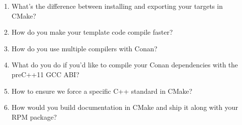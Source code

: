 \begin{enumerate}
\item
What's the difference between installing and exporting your targets in CMake?

\item
How do you make your template code compile faster?

\item
How do you use multiple compilers with Conan?

\item
What do you do if you'd like to compile your Conan dependencies with the preC++11 GCC ABI?

\item
How to ensure we force a specific C++ standard in CMake?

\item
How would you build documentation in CMake and ship it along with your
RPM package?
\end{enumerate}